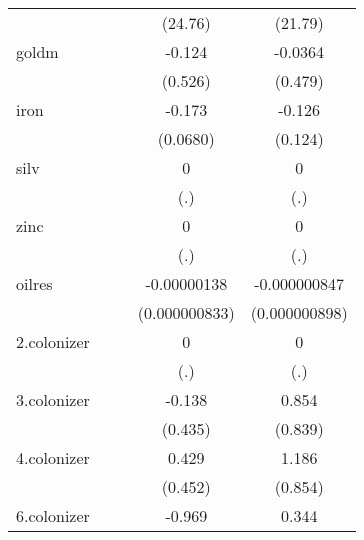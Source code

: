 {\begin{tabular}{l*{4}{c}}
            &                     &                     &     (24.76)         &     (21.79)         \\
[1em]
goldm       &                     &                     &      -0.124         &     -0.0364         \\
            &                     &                     &     (0.526)         &     (0.479)         \\
[1em]
iron        &                     &                     &      -0.173\sym{*}  &      -0.126         \\
            &                     &                     &    (0.0680)         &     (0.124)         \\
[1em]
silv        &                     &                     &           0         &           0         \\
            &                     &                     &         (.)         &         (.)         \\
[1em]
zinc        &                     &                     &           0         &           0         \\
            &                     &                     &         (.)         &         (.)         \\
[1em]
oilres      &                     &                     & -0.00000138         &-0.000000847         \\
            &                     &                     &(0.000000833)         &(0.000000898)         \\
[1em]
2.colonizer &                     &                     &           0         &           0         \\
            &                     &                     &         (.)         &         (.)         \\
[1em]
3.colonizer &                     &                     &      -0.138         &       0.854         \\
            &                     &                     &     (0.435)         &     (0.839)         \\
[1em]
4.colonizer &                     &                     &       0.429         &       1.186         \\
            &                     &                     &     (0.452)         &     (0.854)         \\
[1em]
6.colonizer &                     &                     &      -0.969\sym{***}&       0.344         \\

\end{tabular}}
